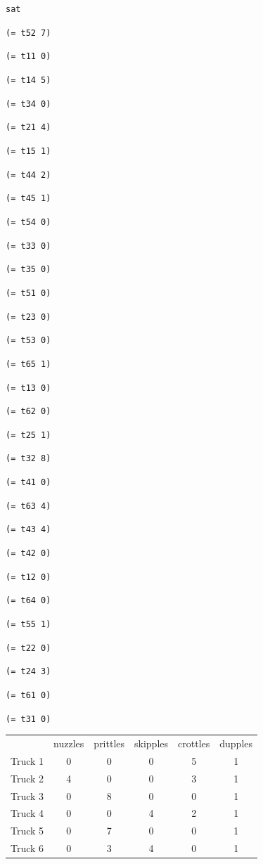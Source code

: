 \documentclass[11pt]{article}
\begin{document}
{\footnotesize

{\tt sat}

{\tt (= t52 7)}

{\tt (= t11 0)}

{\tt (= t14 5)}

{\tt (= t34 0)}

{\tt (= t21 4)}

{\tt (= t15 1)}

{\tt (= t44 2)}

{\tt (= t45 1)}

{\tt (= t54 0)}

{\tt (= t33 0)}

{\tt (= t35 0)}

{\tt (= t51 0)}

{\tt (= t23 0)}

{\tt (= t53 0)}

{\tt (= t65 1)}

{\tt (= t13 0)}

{\tt (= t62 0)}

{\tt (= t25 1)}

{\tt (= t32 8)}

{\tt (= t41 0)}

{\tt (= t63 4)}

{\tt (= t43 4)}

{\tt (= t42 0)}

{\tt (= t12 0)}

{\tt (= t64 0)}

{\tt (= t55 1)}

{\tt (= t22 0)}

{\tt (= t24 3)}

{\tt (= t61 0)}

{\tt (= t31 0)}

}

\begin{table}
  \centering
  \begin{tabular}{|l|c|c|c|c|c|}
    \hline
     & nuzzles & prittles & skipples & crottles & dupples \\
    Truck 1 & 0 & 0 & 0 & 5 & 1 \\
    Truck 2 & 4 & 0 & 0 & 3 & 1 \\
    Truck 3 & 0 & 8 & 0 & 0 & 1 \\
    Truck 4 & 0 & 0 & 4 & 2 & 1 \\
    Truck 5 & 0 & 7 & 0 & 0 & 1 \\
    Truck 6 & 0 & 3 & 4 & 0 & 1 \\
    \hline
  \end{tabular}
\end{table}
\end{document}
